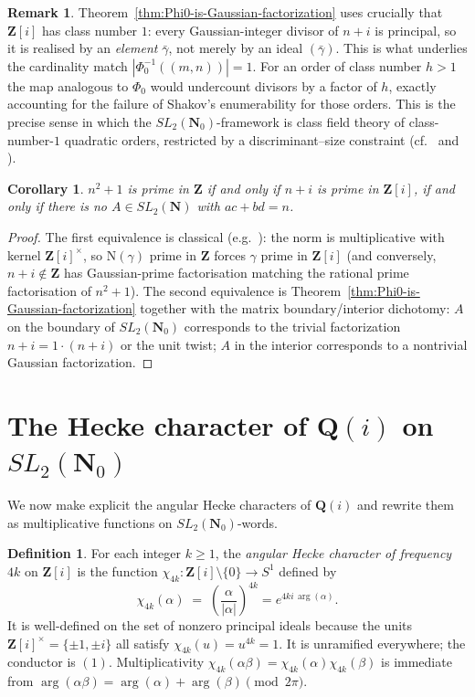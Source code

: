 \documentclass[11pt]{article}
\newtheorem{corollary}[theorem]{Corollary}
\theoremstyle{definition}
\newtheorem{definition}[theorem]{Definition}
\newtheorem{remark}[theorem]{Remark}
\newcommand{\N}{\mathbf{N}}
\newcommand{\Nz}{\mathbf{N}_0}
\newcommand{\Z}{\mathbf{Z}}
\newcommand{\Q}{\mathbf{Q}}
\newcommand{\SLNz}{SL_2(\Nz)}
\newcommand{\SLN}{SL_2(\N)}
\newcommand{\Norm}{\mathrm{N}}
\begin{document}
\begin{remark}\label{rmk:why-class-1-essential}
Theorem~\ref{thm:Phi0-is-Gaussian-factorization} uses crucially that $\Z[i]$ has class
number $1$: every Gaussian-integer divisor of $n+i$ is principal, so it is realised by an
\emph{element} $\bar\gamma$, not merely by an ideal $(\bar\gamma)$. This is what
underlies the cardinality match $|\Phi_0^{-1}((m,n))| = 1$. For an order of class number
$h > 1$ the map analogous to $\Phi_0$ would undercount divisors by a factor of
$h$, exactly accounting for the failure of Shakov's enumerability for those orders. This
is the precise sense in which the $\SLNz$-framework is class field theory of class-number-$1$
quadratic orders, restricted by a discriminant--size constraint (cf.\
\cite[\S5]{R4-binary-quadratic-forms} and \cite{cox}).
\end{remark}

\begin{corollary}\label{cor:prime-iff-gaussian-prime}
$n^2 + 1$ is prime in $\Z$ if and only if $n+i$ is prime in $\Z[i]$, if and only if there is
no $A \in \SLN$ with $ac+bd = n$.
\end{corollary}

\begin{proof}
The first equivalence is classical (e.g.\ \cite[Prop.~5.16]{cox}): the norm is multiplicative
with kernel $\Z[i]^\times$, so $\Norm(\gamma)$ prime in $\Z$ forces $\gamma$ prime in $\Z[i]$
(and conversely, $n+i \notin \Z$ has Gaussian-prime factorisation matching the rational
prime factorisation of $n^2+1$). The second equivalence is
Theorem~\ref{thm:Phi0-is-Gaussian-factorization} together with the matrix
boundary/interior dichotomy: $A$ on the boundary of $\SLNz$ corresponds to the trivial
factorization $n+i = 1\cdot(n+i)$ or the unit twist; $A$ in the interior corresponds to a
nontrivial Gaussian factorization.
\end{proof}

\section{The Hecke character of $\Q(i)$ on $\SLNz$}\label{sec:hecke}

We now make explicit the angular Hecke characters of $\Q(i)$ and rewrite them as
multiplicative functions on $\SLNz$-words.

\begin{definition}\label{def:hecke}
For each integer $k \ge 1$, the \emph{angular Hecke character of frequency $4k$} on $\Z[i]$
is the function $\chi_{4k}\colon \Z[i]\setminus\{0\} \to S^1$ defined by
\[
   \chi_{4k}(\alpha) \;=\; \left(\frac{\alpha}{|\alpha|}\right)^{4k}
   = e^{4k i\,\arg(\alpha)}.
\]
It is well-defined on the set of nonzero principal ideals because the units
$\Z[i]^\times = \{\pm 1, \pm i\}$ all satisfy $\chi_{4k}(u) = u^{4k} = 1$. It is unramified
everywhere; the conductor is $(1)$. Multiplicativity
$\chi_{4k}(\alpha\beta) = \chi_{4k}(\alpha)\chi_{4k}(\beta)$ is immediate from
$\arg(\alpha\beta) = \arg(\alpha) + \arg(\beta) \pmod{2\pi}$.
\end{definition}
\end{document}
